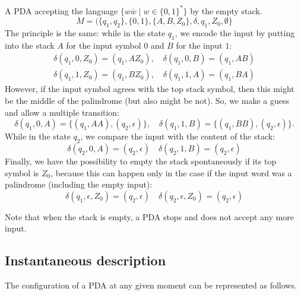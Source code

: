 \begin{page}
\setcounter{section}{6}
\setcounter{subsection}{1}
\setcounter{dfn}{5}
\label{portion:1260}

\begin{exl}
\label{exl:Palindromes}
A PDA accepting the language $\{w \bar{w} \mid w \in \{0,1\}^*\}$ by the empty stack.
\[
M = (\{q_1, q_2\}, \{0, 1\}, \{A, B, Z_0\}, \delta, q_1, Z_0, \emptyset\}
\]
The principle is the same: while in the state $q_1$, we encode the input by putting into the stack $A$ for the input symbol $0$ and $B$ for the input $1$:
\begin{gather*}
\delta(q_1, 0, Z_0) = (q_1, AZ_0), \quad \delta(q_1, 0, B) = (q_1, AB)\\
\delta(q_1, 1, Z_0) = (q_1, BZ_0), \quad \delta(q_1, 1, A) = (q_1, BA)
\end{gather*}
However, if the input symbol agrees with the top stack symbol, then this might be the middle of the palindrome (but also might be not).
So, we make a guess and allow a multiple transition:
\[
\delta(q_1, 0, A) = \{(q_1, AA), (q_2, \epsilon)\}, \quad \delta(q_1, 1, B) = \{(q_1, BB), (q_2, \epsilon)\}.
\]
While in the state $q_2$, we compare the input with the content of the stack:
\[
\delta(q_2, 0, A) = (q_2, \epsilon) \quad \delta(q_2, 1, B) = (q_2, \epsilon)
\]
Finally, we have the possibility to empty the stack spontaneously if its top symbol is $Z_0$,
because this can happen only in the case if the input word was a palindrome (including the empty input):
\[
\delta(q_1, \epsilon, Z_0) = (q_2, \epsilon) \quad \delta(q_2, \epsilon, Z_0) = (q_2, \epsilon)
\]
\end{exl}

\end{page}

\begin{page}
\setcounter{section}{6}
\setcounter{subsection}{2}
\setcounter{dfn}{5}
\label{portion:1261}


Note that when the stack is empty, a PDA stops and does not accept any more input.



\end{page}

\begin{page}
\setcounter{section}{6}
\setcounter{subsection}{2}
\setcounter{dfn}{5}
\label{portion:1263}

\subsection{Instantaneous description}
The configuration of a PDA at any given moment can be represented as follows.


\end{page}

